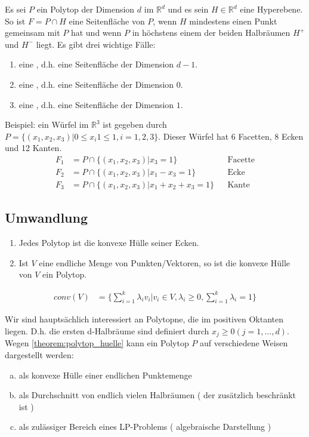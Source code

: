 Es sei $P$ ein Polytop der Dimension $d$ im $\mathbb R^d$ und es sein $H \in \mathbb R^d$ eine Hyperebene. So ist $F = P \cap H$ eine Seitenfläche von $P$, wenn $H$ mindestens einen Punkt gemeinsam mit $P$ hat und wenn $P$ in höchstens einem der beiden Halbräumen $H^{+}$ und $H^{-}$ liegt. Es gibt drei wichtige Fälle:
\begin{enumerate}
\item eine , d.h. eine Seitenfläche der Dimension $d-1$.
\item eine , d.h. eine Seitenfläche der Dimension $0$.
\item eine , d.h. eine Seitenfläche der Dimension $1$.
\end{enumerate}
Beispiel: ein Würfel im $\mathbb R^3$ ist gegeben durch $P = \{(x_1,x_2,x_3) | 0 \leq x_i1 \leq 1, i=1,2,3\}$. Dieser Würfel hat 6 Facetten, 8 Ecken und 12 Kanten.
\begin{align*}
F_1 &= P \cap \{(x_1,x_2,x_3) | x_3 = 1 \} && \text{Facette} \\
F_2 &= P \cap \{(x_1,x_2,x_3) | x_1 - x_3 = 1 \} && \text{Ecke} \\
F_3 &= P \cap \{(x_1,x_2,x_3) | x_1 + x_2 + x_3 = 1 \} && \text{Kante}
\end{align*}
\subsection{Umwandlung}
\begin{theorem}
\label{theorem:polytop_huelle}
\begin{enumerate}
\item Jedes Polytop ist die konvexe Hülle seiner Ecken.
\item Ist $V$ eine endliche Menge von Punkten/Vektoren, so ist die konvexe Hülle von $V$ ein Polytop.
\end{enumerate}
\end{theorem}
\begin{definition}
\begin{align*}
conv(V) &= \Big \{ \sum_{i=1}^k \lambda_i v_i \Big | v_i \in V, \lambda_i \geq 0, \sum_{i=1}^k \lambda_i = 1 \Big \}
\end{align*}
\end{definition}
Wir sind hauptsächlich interessiert an Polytopne, die im positiven Oktanten liegen. D.h. die ersten d-Halbräume sind definiert durch $x_j \geq 0 ( j = 1,\dotsc,d)$.
Wegen \ref{theorem:polytop_huelle} kann ein Polytop $P$ auf verschiedene Weisen dargestellt werden:
\begin{enumerate}[a)]
\item als konvexe Hülle einer endlichen Punktemenge
\item als Durchschnitt von endlich vielen Halbräumen ( der zusätzlich beschränkt ist )
\item als zulässiger Bereich eines LP-Problems ( algebraische Darstellung )
\end{enumerate}
